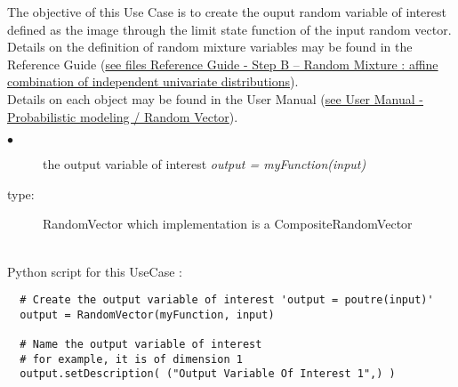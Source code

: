 \renewcommand{\filename}{docUC_OVI_FromLSF.tex}
\renewcommand{\filetitle}{UC : Creation of the ouput random vector}

\HeaderIIILevel

\label{CompositeRandomVector}



The objective of this Use Case is to create the ouput random variable of interest defined as the image through the limit state function of the input random vector.\\

Details on the definition of random mixture variables may be found in the Reference Guide (\href{OpenTURNS_ReferenceGuide.pdf}{see files Reference Guide - Step B -- Random Mixture : affine combination of independent univariate distributions}).\\

Details on each object may be found in the User Manual  (\href{OpenTURNS_UserManual_TUI.pdf}{see User Manual - Probabilistic modeling / Random Vector}).\\

{
  \begin{description}
  \item[$\bullet$] the output variable of interest {\itshape output = myFunction(input)}
  \item[type:] RandomVector which implementation is a CompositeRandomVector
  \end{description}
}

\textspace\\
Python script for this UseCase :

\begin{lstlisting}
  # Create the output variable of interest 'output = poutre(input)'
  output = RandomVector(myFunction, input)

  # Name the output variable of interest
  # for example, it is of dimension 1
  output.setDescription( ("Output Variable Of Interest 1",) )
\end{lstlisting}

